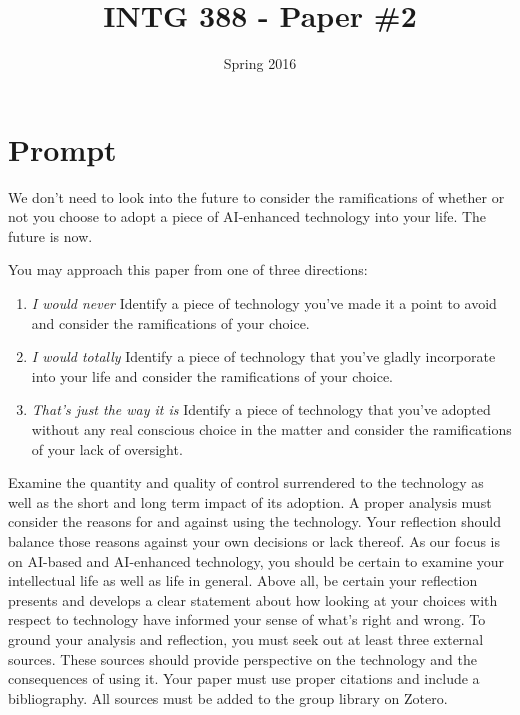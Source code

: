 \documentclass[nobib]{tufte-handout}
\title{INTG 388 - Paper \#2 }
\author{}
\date{ Spring 2016 }
\begin{document}
\maketitle

\section{Prompt}

We don't need to look into the future to consider the ramifications of whether or not you choose to adopt a piece of AI-enhanced technology into your life.  The future is now.  

You may approach this paper from one of three directions:
\begin{enumerate}
\item \textit{I would never} \newline
Identify a piece of technology you've made it a point to avoid and consider the ramifications of your choice.

\item \textit{I would totally} \newline
Identify a piece of technology that you've gladly incorporate into your life and consider the ramifications of your choice. 

\item \textit{That's just the way it is} \newline
Identify a piece of technology that you've adopted without any real conscious choice in the matter and consider the ramifications of your lack of oversight. 
\end{enumerate}

Examine the quantity and quality of control surrendered to the  technology as well as the short and long term impact of its adoption. A proper analysis must consider the reasons for and against using the technology. Your reflection should balance those reasons against your own decisions or lack thereof. As our focus is on AI-based and AI-enhanced technology, you should be certain to examine your intellectual life as well as life in general. Above all, be certain your reflection presents and develops a clear statement about how looking at your choices with respect to technology have informed your sense of what's right and wrong. To ground your analysis and reflection, you must seek out at least three external sources. These sources should provide perspective on the technology and the consequences of using it. Your paper must use proper citations and include a bibliography. All sources must be added to the group library on Zotero.  
\end{document}

